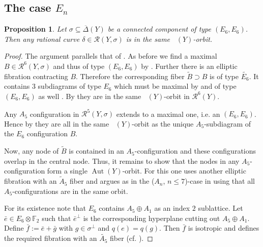 \documentclass[a4paper]{amsart}
\theoremstyle{definition}
\theoremstyle{plain}
\newtheorem{proposition}[definition]{Proposition}
\DeclareMathOperator{\Aut}{Aut}
\DeclareMathOperator{\aut}{Aut^*}
\newcommand{\FF}{\mathbb{F}}
\newcommand{\R}{\mathcal{R}}
\newcommand{\DeltabarY}{\overline{\Delta}(Y)}
\begin{document}
\subsection{The case $E_n$}
\begin{proposition}\label{lemma:E6-transitive}
Let $\sigma \subseteq \DeltabarY$ be a connected component of type $(E_6,E_6)$.
Then any rational curve $\delta \in \R(Y,\sigma)$ is in the same $\aut(Y)$-orbit.
\end{proposition}
\begin{proof}
The argument parallels that of . As before we find a maximal $B \in \R^6(Y,\sigma)$ and thus of type $(E_6,E_6)$ by .
Further there is an elliptic fibration contracting $B$. Therefore the corresponding fiber $\widetilde{B} \supset B$ is of type $\widetilde{E_6}$.
It contains $3$ subdiagrams of type $E_6$ which must be maximal by  and of type $(E_6,E_6)$ as well .  By  they are in the same $\aut(Y)$-orbit in $\R^6(Y)$.

Any $A_5$ configuration in $\R^5(Y,\sigma)$ extends to a maximal one, i.e. an $(E_6,E_6)$.
Hence by 
they are all in the same $\aut(Y)$-orbit as the unique $A_5$-subdiagram of the $E_6$ configuration $B$.

Now, any node of $\widetilde{B}$ is contained in an $A_5$-configuration and these configurations overlap in the central node.
Thus, it remains to show that the nodes in any $A_5$-configuration form a single $\Aut(Y)$-orbit.
For this one uses another elliptic fibration with an $\widetilde{A}_5$ fiber and argues as in the ($A_n$, $n\leq 7$)-case in  using that all $A_5$-configurations are in the same orbit. 

For its existence note that $E_6$ contains $A_5 \oplus A_1$ as an index $2$ sublattice. Let $\bar e \in E_6\otimes \FF_2$ such that $\bar e^\perp$ is the corresponding hyperplane cutting out $A_5 \oplus A_1$. 
Define $\bar f:=\bar e+\bar g$ with $g \in \sigma^\perp$ and $q(e)=q(g)$. 
Then $\bar f$ is isotropic and defines the required fibration with an $\widetilde{A_5}$ fiber (cf. \cite{brandhorst_shimada:tautaubar}).
\end{proof}
\end{document}
